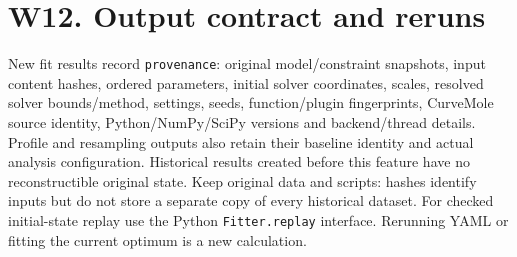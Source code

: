 \documentclass[
  10pt,
  a4paper,
  oneside]{scrreprt}
\begin{document}
\hypertarget{w12.-output-contract-and-reruns}{%
\section{W12. Output contract and
reruns}\label{w12.-output-contract-and-reruns}}

New fit results record \texttt{provenance}: original model/constraint
snapshots, input content hashes, ordered parameters, initial solver
coordinates, scales, resolved solver bounds/method, settings, seeds,
function/plugin fingerprints, CurveMole source identity,
Python/NumPy/SciPy versions and backend/thread details. Profile and
resampling outputs also retain their baseline identity and actual
analysis configuration. Historical results created before this feature
have no reconstructible original state. Keep original data and scripts:
hashes identify inputs but do not store a separate copy of every
historical dataset. For checked initial-state replay use the Python
\texttt{Fitter.replay} interface. Rerunning YAML or fitting the current
optimum is a new calculation.
\end{document}
